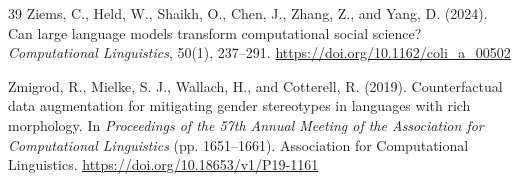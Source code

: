 \documentclass[a4paper,fleqn,review,longmktitle]{cas-sc}
\begin{document}
\begin{thebibliography}{39}
Ziems, C., Held, W., Shaikh, O., Chen, J., Zhang, Z., and Yang, D. (2024).
Can large language models transform computational social science?
\emph{Computational Linguistics}, 50(1), 237--291.
\url{https://doi.org/10.1162/coli_a_00502}

Zmigrod, R., Mielke, S. J., Wallach, H., and Cotterell, R. (2019).
Counterfactual data augmentation for mitigating gender stereotypes in languages with rich morphology.
In \emph{Proceedings of the 57th Annual Meeting of the Association for Computational Linguistics} (pp. 1651--1661).
Association for Computational Linguistics.
\url{https://doi.org/10.18653/v1/P19-1161}

\end{thebibliography}
\end{document}
